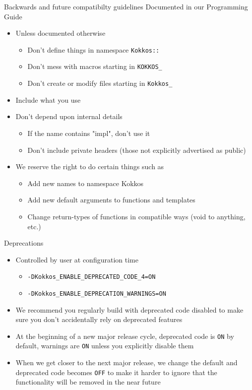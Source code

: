 \begin{frame}[fragile]{Backwards and future compatibilty guidelines}
Documented in our Programming Guide
\begin{itemize}
\item Unless documented otherwise
  \begin{itemize}
  \item Don't define things in namespace \texttt{Kokkos::}
  \item Don't mess with macros starting in \texttt{KOKKOS\_}
  \item Don't create or modify files starting in \texttt{Kokkos\_}
  \end{itemize}
\item Include what you use
\item Don't depend upon internal details
  \begin{itemize}
  \item If the name contains "impl", don't use it
  \item Don't include private headers (those not explicitly advertised as public)
  \end{itemize}
\item We reserve the right to do certain things such as
  \begin{itemize}
  \item Add new names to namespace Kokkos
  \item Add new default arguments to functions and templates
  \item Change return-types of functions in compatible ways (void to anything, etc.)
  \end{itemize}
\end{itemize}

\end{frame}

\begin{frame}[fragile]{Deprecations}

\begin{itemize}
\item Controlled by user at configuration time
\begin{itemize}
  \item \texttt{-DKokkos\_ENABLE\_DEPRECATED\_CODE\_4=ON}
  \item \texttt{-DKokkos\_ENABLE\_DEPRECATION\_WARNINGS=ON}
\end{itemize}

\item We recommend you regularly build with deprecated code disabled to make
      sure you don't accidentally rely on deprecated features

\item At the beginning of a new major release cycle, deprecated code is
      \texttt{ON} by default, warnings are \texttt{ON} unless you explicitly
      disable them

\item When we get closer to the next major release, we change the default and
      deprecated code becomes \texttt{OFF} to make it harder to ignore that
      the functionality will be removed in the near future
\end{itemize}

\end{frame}

